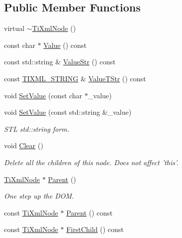 \subsection*{Public Member Functions}
\begin{DoxyCompactItemize}
\item 
virtual \hyperlink{class_ti_xml_node_a027a76cccd359c831ee4024b58c49625}{$\sim$\-Ti\-Xml\-Node} ()
\item 
const char $\ast$ \hyperlink{class_ti_xml_node_a77943eb90d12c2892b1337a9f5918b41}{Value} () const 
\item 
const std\-::string \& \hyperlink{class_ti_xml_node_a6d9e505619d39bf50bfd9609c9169ea5}{Value\-Str} () const 
\item 
const \hyperlink{tinyxml_8h_a92bada05fd84d9a0c9a5bbe53de26887}{T\-I\-X\-M\-L\-\_\-\-S\-T\-R\-I\-N\-G} \& \hyperlink{class_ti_xml_node_a83ece13d2ea66dac66e0b21332229239}{Value\-T\-Str} () const 
\item 
void \hyperlink{class_ti_xml_node_a2a38329ca5d3f28f98ce932b8299ae90}{Set\-Value} (const char $\ast$\-\_\-value)
\item 
void \hyperlink{class_ti_xml_node_a2598d5f448042c1abbeae4503dd45ff2}{Set\-Value} (const std\-::string \&\-\_\-value)
\begin{DoxyCompactList}\small\item\em S\-T\-L std\-::string form. \end{DoxyCompactList}\item 
void \hyperlink{class_ti_xml_node_a708e7f953df61d4d2d12f73171550a4b}{Clear} ()
\begin{DoxyCompactList}\small\item\em Delete all the children of this node. Does not affect 'this'. \end{DoxyCompactList}\item 
\hyperlink{class_ti_xml_node}{Ti\-Xml\-Node} $\ast$ \hyperlink{class_ti_xml_node_ab643043132ffd794f8602685d34a982e}{Parent} ()
\begin{DoxyCompactList}\small\item\em One step up the D\-O\-M. \end{DoxyCompactList}\item 
const \hyperlink{class_ti_xml_node}{Ti\-Xml\-Node} $\ast$ \hyperlink{class_ti_xml_node_a78878709e53066f06eb4fcbcdd3a5260}{Parent} () const 
\item 
const \hyperlink{class_ti_xml_node}{Ti\-Xml\-Node} $\ast$ \hyperlink{class_ti_xml_node_a44c8eee26bbe2d1b2762038df9dde2f0}{First\-Child} () const 

\end{DoxyCompactItemize}
